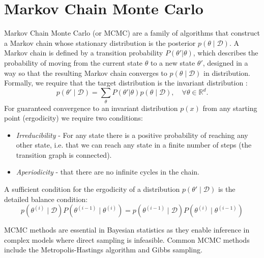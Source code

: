 \documentclass[11pt, twoside]{report}
\begin{document}
\section{Markov Chain Monte Carlo}
Markov Chain Monte Carlo (or MCMC) are a family of algorithms that construct a Markov chain whose stationary distribution is the posterior $p(\theta \mid \mathcal{D})$. A Markov chain is defined by a transition probability $P(\theta' | \theta)$, which describes the probability of moving from the current state $\theta$ to a new state $\theta'$, designed in a way so that the resulting Markov chain converges to $p(\theta \mid \mathcal{D})$ in distribution. Formally, we require that the target distribution is the invariant distribution \cite{andrieu2003introduction}:
\begin{equation*}
    p(\theta' \mid \mathcal{D}) = \sum_{\theta} P(\theta' | \theta)p(\theta \mid \mathcal{D}), \quad \forall \theta \in \mathbb{R}^d.
\end{equation*}
For guaranteed convergence to an invariant distribution $p(x)$ from any starting point (ergodicity) we require two conditions:
\begin{itemize}
    \item \textit{Irreducibility} - For any state there is a positive probability of reaching any other state, i.e. that we can reach any state in a finite number of steps (the transition graph is connected).
    \item \textit{Aperiodicity} - that there are no infinite cycles in the chain.
\end{itemize}
A sufficient condition for the ergodicity of a distribution $p(\theta' \mid \mathcal{D})$ is the detailed balance condition:
\begin{equation} \label{detailed_balance}
p\left(\theta^{(i)} \mid \mathcal{D}\right) P\left(\theta^{(i-1)} \mid \theta^{(i)}\right)=p\left(\theta^{(i-1)}\mid \mathcal{D}\right) P\left(\theta^{(i)} \mid \theta^{(i-1)}\right)
\end{equation}

MCMC methods are essential in Bayesian statistics as they enable inference in complex models where direct sampling is infeasible. Common MCMC methods include the Metropolis-Hastings algorithm and Gibbs sampling.%
\end{document}
